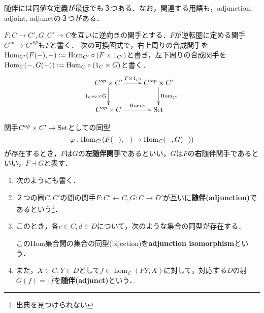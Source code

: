 \documentclass[uplatex, dvipdfmx]{jsreport}
\begin{document}
\begin{screen}
    随伴には同値な定義が最低でも３つある．なお，関連する用語も，adjunction, adjoint, adjunctの３つがある．
\end{screen}

\begin{notation}
    $F:C\to C',G:C'\to C$を互いに逆向きの関手とする．$F$が逆転圏に定める関手$C^{op}\to C'^{op}$も$F$と書く．
    次の可換図式で，右上周りの合成関手を$\mathrm{Hom}_{C'}(F(-),-):=\mathrm{Hom}_{C'}\circ(F\times 1_{C'})$と書き，左下周りの合成関手を
    $\mathrm{Hom}_{C}(-,G(-)):=\mathrm{Hom}_C\circ(1_C\times G)$と書く．
    \[\xymatrix{
        C^{op}\times C'\ar[r]^-{F\times 1_{C'}}\ar[d]_-{1_{C^{op}}\times G}&C'^{op}\times C'\ar[d]^-{\Hom_{C'}}\\
        C^{op}\times C\ar[r]^-{\Hom_C}&\Set
    }\]
\end{notation}

\begin{definition}[adjoint]
    関手$C^{op}\times C'\to\mathrm{Set}$としての同型
    \[\varphi:\mathrm{Hom}_{C'}(F(-),-)\to\mathrm{Hom}_C(-,G(-))\]
    が存在するとき，$F$は$G$の\textbf{左随伴関手}であるといい，$G$は$F$の\textbf{右}随伴関手であるといい，$F\dashv G$と表す．
\end{definition}

\begin{remark}\mbox{}
    \begin{enumerate}
        \item 次のようにも書く．
        \begin{center}\end{center}
        \item ２つの圏$C,C'$の間の関手$F:C'\leftarrow C, G:C\rightarrow D'$が互いに\textbf{随伴(adjunction)}であるという\footnote{出典を見つけられない}．
        \item このとき，各$c\in C, d\in D$について，次のような集合の同型が存在する．
        \begin{center}\end{center}
        このHom集合間の集合の同型(bijection)を\textbf{adjunction isomorphism}という．
        \item また，$X\in C, Y\in D$として$f\in\hom_C(FY,X)$に対して，対応する$D$の射$G(f)=:\overline{f}$を\textbf{随伴(adjunct)}という．
    \end{enumerate}
\end{remark}
\end{document}
